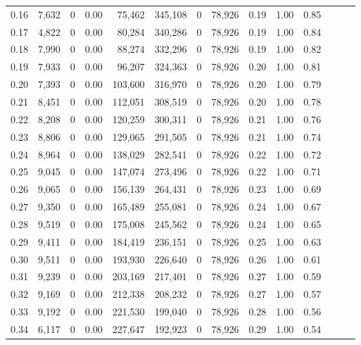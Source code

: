 \begin{tabular}{rrrrrrrrrrrrrr}
0.16 &  7,632 &      0 &  0.00 &   75,462 &  345,108 &       0 &  78,926 &  0.19 &  1.00 &      0.85 \\
0.17 &  4,822 &      0 &  0.00 &   80,284 &  340,286 &       0 &  78,926 &  0.19 &  1.00 &      0.84 \\
0.18 &  7,990 &      0 &  0.00 &   88,274 &  332,296 &       0 &  78,926 &  0.19 &  1.00 &      0.82 \\
0.19 &  7,933 &      0 &  0.00 &   96,207 &  324,363 &       0 &  78,926 &  0.20 &  1.00 &      0.81 \\
0.20 &  7,393 &      0 &  0.00 &  103,600 &  316,970 &       0 &  78,926 &  0.20 &  1.00 &      0.79 \\
0.21 &  8,451 &      0 &  0.00 &  112,051 &  308,519 &       0 &  78,926 &  0.20 &  1.00 &      0.78 \\
0.22 &  8,208 &      0 &  0.00 &  120,259 &  300,311 &       0 &  78,926 &  0.21 &  1.00 &      0.76 \\
0.23 &  8,806 &      0 &  0.00 &  129,065 &  291,505 &       0 &  78,926 &  0.21 &  1.00 &      0.74 \\
0.24 &  8,964 &      0 &  0.00 &  138,029 &  282,541 &       0 &  78,926 &  0.22 &  1.00 &      0.72 \\
0.25 &  9,045 &      0 &  0.00 &  147,074 &  273,496 &       0 &  78,926 &  0.22 &  1.00 &      0.71 \\
0.26 &  9,065 &      0 &  0.00 &  156,139 &  264,431 &       0 &  78,926 &  0.23 &  1.00 &      0.69 \\
0.27 &  9,350 &      0 &  0.00 &  165,489 &  255,081 &       0 &  78,926 &  0.24 &  1.00 &      0.67 \\
0.28 &  9,519 &      0 &  0.00 &  175,008 &  245,562 &       0 &  78,926 &  0.24 &  1.00 &      0.65 \\
0.29 &  9,411 &      0 &  0.00 &  184,419 &  236,151 &       0 &  78,926 &  0.25 &  1.00 &      0.63 \\
0.30 &  9,511 &      0 &  0.00 &  193,930 &  226,640 &       0 &  78,926 &  0.26 &  1.00 &      0.61 \\
0.31 &  9,239 &      0 &  0.00 &  203,169 &  217,401 &       0 &  78,926 &  0.27 &  1.00 &      0.59 \\
0.32 &  9,169 &      0 &  0.00 &  212,338 &  208,232 &       0 &  78,926 &  0.27 &  1.00 &      0.57 \\
0.33 &  9,192 &      0 &  0.00 &  221,530 &  199,040 &       0 &  78,926 &  0.28 &  1.00 &      0.56 \\
0.34 &  6,117 &      0 &  0.00 &  227,647 &  192,923 &       0 &  78,926 &  0.29 &  1.00 &      0.54 \\

\end{tabular}
